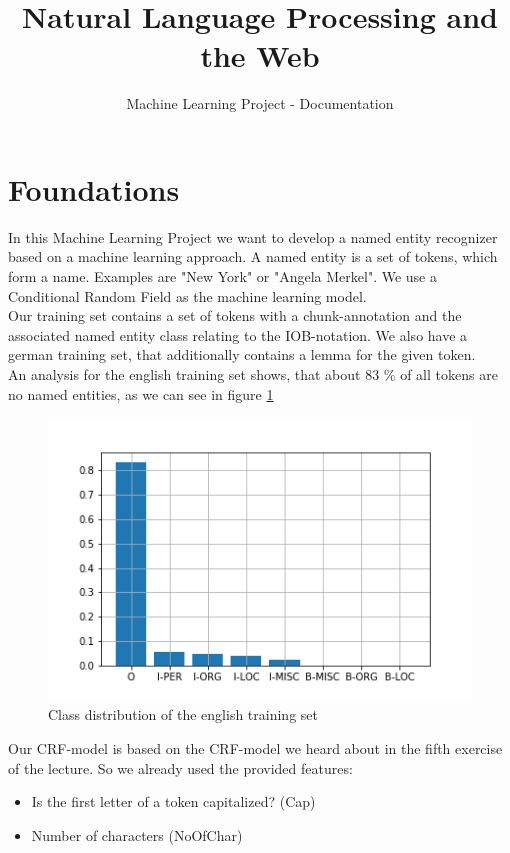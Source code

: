 \documentclass[noindent, nochapname]{tudexercise}
\title{Natural Language Processing and the Web}
\subtitle{Machine Learning Project - Documentation}
\begin{document}
	\lstset{language=Java}
	\maketitle
	
	\section{Foundations}
		In this Machine Learning Project we want to develop a named entity recognizer based on a machine learning approach. A named entity is a set of tokens, which form a name. Examples are "New York" or "Angela Merkel". We use a Conditional Random Field as the machine learning model.\\
		Our training set contains a set of tokens with a chunk-annotation and the associated named entity class relating to the IOB-notation. We also have a german training set, that additionally contains a lemma for the given token.\\
		An analysis for the english training set shows, that about 83 \% of all tokens are no named entities, as we can see in figure \ref{fig:class_distribution}
		
		\begin{figure}[h]
			\centering
			\includegraphics[scale=0.6]{img/class_distribution.png}
			\caption{Class distribution of the english training set}
			\label{fig:class_distribution}
		\end{figure}
		
		Our CRF-model is based on the CRF-model we heard about in the fifth exercise of the lecture. So we already used the provided features:
		\begin{itemize}
			\item Is the first letter of a token capitalized? (Cap)
			
			\item Number of characters (NoOfChar)
		\end{itemize}
		
\end{document}
